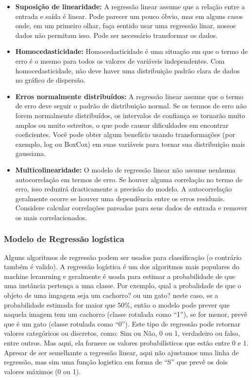 \documentclass[
  letterpaper,
  DIV=11,
  numbers=noendperiod]{scrreprt}
\begin{document}
\begin{itemize}
\item
  \textbf{Suposição de linearidade:} A regressão linear assume que a
  relação entre a entrada e saída é linear. Pode parecer um pouco óbvio,
  mas em alguns casos onde, em um primeiro olhar, faça sentido usar uma
  regressão linar, nossos dados não permitam isso. Pode ser necessário
  transformar os dados.
\item
  \textbf{Homocedasticidade:} Homocedasticidade é uma situação em que o
  termo de erro é o mesmo para todos os valores de variáveis
  \hspace{0pt}\hspace{0pt}independentes. Com homocedasticidade, não deve
  haver uma distribuição padrão clara de dados no gráfico de dispersão.
\item
  \textbf{Erros normalmente distribuídos:} A regressão linear assume que
  o termo de erro deve seguir o padrão de distribuição normal. Se os
  termos de erro não forem normalmente distribuídos, os intervalos de
  confiança se tornarão muito amplos ou muito estreitos, o que pode
  causar dificuldades em encontrar coeficientes. Você pode obter algum
  benefício usando transformações (por exemplo, log ou BoxCox) em suas
  variáveis \hspace{0pt}\hspace{0pt}para tornar sua distribuição mais
  gaussiana.
\item
  \textbf{Multicolinearidade:} O modelo de regressão linear não assume
  nenhuma autocorrelação em termos de erro. Se houver alguma correlação
  no termo de erro, isso reduzirá drasticamente a precisão do modelo. A
  autocorrelação geralmente ocorre se houver uma dependência entre os
  erros residuais. Considere calcular correlações pareadas para seus
  dados de entrada e remover os mais correlacionados.
\end{itemize}

\hypertarget{modelo-de-regressuxe3o-loguxedstica}{%
\subsubsection{Modelo de Regressão
logística}\label{modelo-de-regressuxe3o-loguxedstica}}

Alguns algoritmos de regressão podem ser usados para classificação (o
contrário também é valido). A regressão logística é um dos algoritmos
mais populares do machine leranrning e geralmente é usada para estimar a
probabilidade de que uma instância pertença a uma classe. Por exemplo,
qual a probalidade de que o objeto de uma imgagem seja um cachorro? ou
um gato? neste caso, se a probabilidade estimada for maior que 50\%,
então o modelo pode prever que naquela imagem tem um cachorro (classe
rotulada como ``1''), se for menor, prevê que é um gato (classe rotulada
como ``0''). Este tipo de regressão pode retornar valores categóricos ou
discretos, como: Sim ou Não, 0 ou 1, verdadeiro ou falso, entre outros.
Mas aqui, ela fornece os valores probabilísticos que estão entre 0 e 1.
Apresar de ser semelhante a regressão linear, aqui não ajustamos uma
linha de regressão, mas sim uma função logistica em forma de ``S'' que
prevê os dois valores máximos (0 ou 1).
\end{document}

